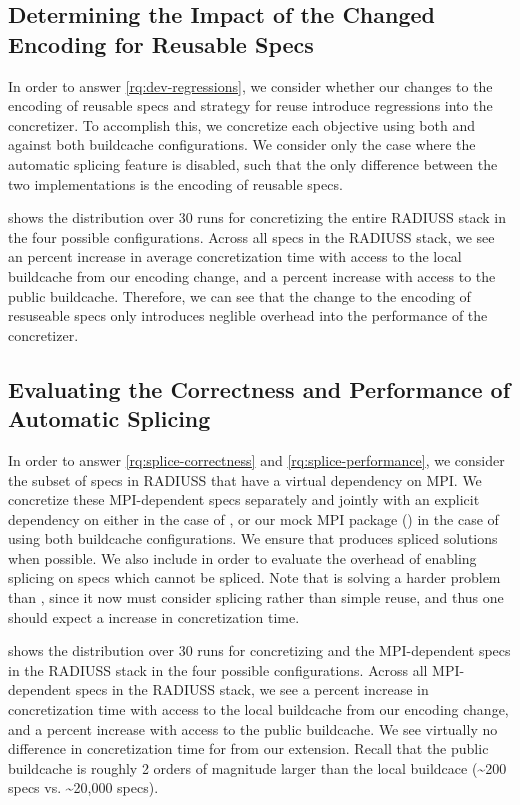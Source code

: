 \subsection{Determining the Impact of the Changed Encoding for Reusable Specs}
\label{sec:encoding-exp}
In order to answer \ref{rq:dev-regressions}, we consider whether our
changes to the encoding of reusable specs and strategy for reuse
introduce regressions into the concretizer.  To accomplish this, we concretize
each objective using both \oldspack{} and \splicespack{} against both
buildcache configurations. We consider only the case where the automatic
splicing feature is disabled, such that the only difference between the two
implementations is the encoding of reusable specs.
\par
{} shows the distribution over 30 runs
for concretizing the entire RADIUSS stack in the four possible
configurations. Across all specs in the RADIUSS stack, we see an
\enclocalincrease{} percent increase in average concretization time with access
to the local buildcache from our encoding change, and a \encremoteincrease{}
percent increase with access to the public buildcache. Therefore, we can see
that the change to the encoding of resuseable specs only introduces neglible
overhead into the performance of the concretizer.

\subsection{Evaluating the Correctness and Performance of Automatic Splicing}
\label{sec:corr-perf-exps}
In order to answer \ref{rq:splice-correctness} and \ref{rq:splice-performance},
we consider the subset of specs in RADIUSS that have a virtual dependency on
MPI. We concretize these MPI-dependent specs separately and jointly with an
explicit dependency on either  in the case of \oldspack{}, or our
mock MPI package () in the case of \splicespack{} using both
buildcache configurations. We ensure that \splicespack{} produces spliced
solutions when possible. We also include  in order to evaluate
the overhead of enabling splicing on specs which cannot be spliced. Note that
\splicespack{} is solving a harder problem than \oldspack{}, since it now must
consider splicing rather than simple reuse, and thus one should expect a
increase in concretization time.

 shows the distribution over 30 runs for
concretizing  and the MPI-dependent specs in the RADIUSS stack
in the four possible configurations. Across all MPI-dependent specs in the
RADIUSS stack, we see a \splicelocalincrease{} percent increase in
concretization time with access to the local buildcache from our encoding
change, and a \spliceremoteincrease{} percent increase with access to the public
buildcache. We see virtually no difference in concretization time for
 from our extension. Recall that the public buildcache is
roughly 2 orders of magnitude larger than the local buildcace (\textasciitilde{}200 specs
vs. \textasciitilde{}20,000 specs).

